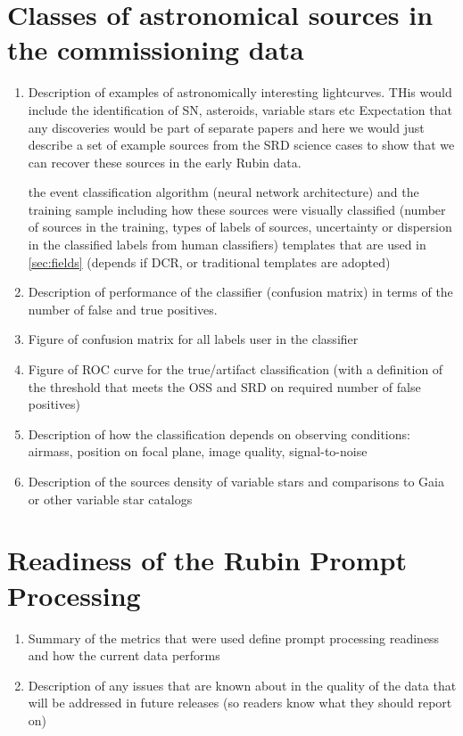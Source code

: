 \section{Classes of astronomical sources in the commissioning data}

\begin{enumerate}

    \item Description of examples of astronomically interesting lightcurves. THis would include the identification of SN, asteroids, variable stars etc Expectation that 
    any discoveries would be part of separate papers and here we would just describe a set of example sources from the SRD science cases to show
    that we can recover these sources in the early Rubin data.
    
    
    the event classification algorithm (neural network architecture) and the training sample including how these sources were
    visually classified (number of sources in the training, types of labels of sources, uncertainty or dispersion in the classified labels from human classifiers)
    templates that are used in \ref{sec:fields} (depends if DCR, or traditional templates are adopted)
    \item Description of performance of the classifier (confusion matrix) in terms of the number of false and true positives. 
    \item Figure of confusion matrix for all labels user in the classifier
    \item Figure of ROC curve for the true/artifact classification (with a definition of the threshold that meets the OSS and SRD on required number of false positives)
    \item Description of how the classification depends on observing conditions: airmass, position on focal plane, image quality, signal-to-noise
    \item Description of the sources density of variable stars and comparisons to Gaia or other variable star catalogs
    
\end{enumerate}


\section {Readiness of the Rubin Prompt Processing}

\begin{enumerate}

    \item Summary of the metrics that were used define prompt processing readiness and how the current data performs
    \item Description of any issues that are known about in the quality of the data that will be addressed in future releases (so readers know what they should report on)   
    
 \end{enumerate}



